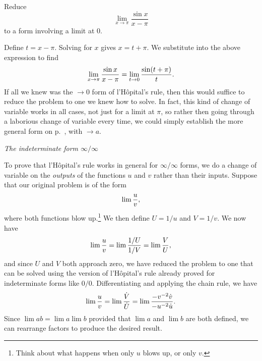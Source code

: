 \begin{eg}
\egquestion
Reduce
\begin{equation*}
  \lim_{x\rightarrow \pi}\frac{\sin x}{x-\pi}
\end{equation*}
to a form involving a limit at 0.

\eganswer
Define $t=x-\pi$. Solving for $x$ gives $x=t+\pi$. We substitute into the above expression
to find
\begin{equation*}
  \lim_{x\rightarrow \pi}\frac{\sin x}{x-\pi} =   \lim_{t\rightarrow 0}\frac{\sin (t+\pi)}{t}.
\end{equation*}
If all we knew was the $\rightarrow0$ form of l'H\^{o}pital's rule, then this would suffice
to reduce the problem to one we knew how to solve. In fact, this kind of change of variable works in
all cases, not just for a limit at $\pi$, so rather then going through a laborious change of variable
every time, we could simply establish the more general form on p.~\pageref{lhospital-simple}, with
$\rightarrow a$.
\end{eg}

\emph{The indeterminate form $\infty/\infty$}\label{lhospital-inf-inf}

To prove that l'H\^{o}pital's rule works in general for $\infty/\infty$ forms, 
we do a change of variable on the \emph{outputs} of the functions $u$ and $v$
rather than their inputs. Suppose that our original problem is of the form
\begin{equation*}
  \lim \frac{u}{v},
\end{equation*}
where both functions blow up.\footnote{Think about what happens when only $u$ blows up,
or only $v$.} We then define $U=1/u$ and $V=1/v$. We now have
\begin{equation*}
  \lim \frac{u}{v} = \lim \frac{1/U}{1/V} =\lim \frac{V}{U},
\end{equation*}
and since $U$ and $V$ both approach zero, we have reduced the problem to one that can be solved
using the version of l'H\^{o}pital's rule already proved
for indeterminate forms like $0/0$. Differentiating and applying the chain rule, we have
\begin{equation*}
  \lim \frac{u}{v} = \lim \frac{\dot{V}}{\dot{U}} = \lim \frac{-v^{-2}\dot{v}}{-u^{-2}\dot{u}}.
\end{equation*}
Since $\lim ab=\lim a \lim b$ provided that $\lim a$ and $\lim b$ are both defined, we can rearrange
factors to produce the desired result.



